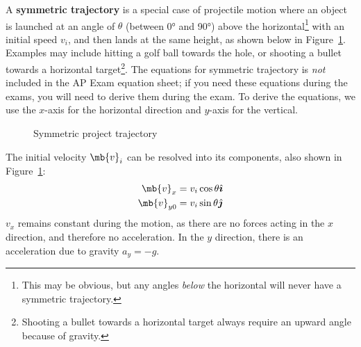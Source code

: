 \documentclass{../../../Physics.12/ossphys}
\begin{document}

\begin{center}
\end{center}

A \textbf{symmetric trajectory} is a special case of projectile motion where an
object is launched at an angle of $\theta$ (between \ang{0} and \ang{90}) above
the horizontal\footnote{This may be obvious, but any angles \emph{below} the 
  horizontal will never have a symmetric trajectory.} with an initial speed
$v_i$, and then lands at the same height, as shown below in Figure~\ref{sym}.
Examples may include hitting a golf ball towards the hole, or shooting a bullet
towards a horizontal target\footnote{Shooting a bullet towards a horizontal
  target always require an upward angle because of gravity.}. The equations for
symmetric trajectory is \emph{not} included in the AP Exam equation sheet; if
you need these equations during the exams, you will need to derive them during
the exam. To derive the equations, we use the $x$-axis for the horizontal
direction and $y$-axis for the vertical.
\begin{figure}[ht]
  \begin{center}
  \end{center}
  \vspace{-.2in}
  \caption{Symmetric project trajectory}
  \label{sym}
\end{figure}

The initial velocity $\mb{v}_i$ can be resolved into its components, also shown
in Figure~\ref{sym}:
\begin{align*}
  \mb{v}_x   &=v_i\cos\theta\hat{\bm{\imath}}\\
  \mb{v}_{y0}&=v_i\sin\theta\hat{\bm{\jmath}}
\end{align*}
$v_x$ remains constant during the motion, as there are no forces acting in the
$x$ direction, and therefore no acceleration. In the $y$ direction, there is an
acceleration due to gravity $a_y=-g$.
\end{document}
